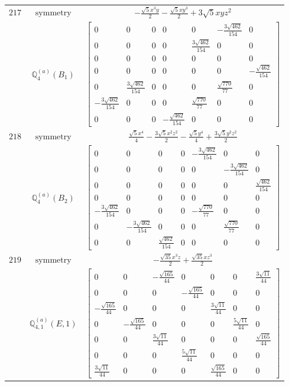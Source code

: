 \documentclass[fleqn,8pt,landscape]{jsarticle}
\begin{document}
\begin{longtable}{ccc}
$ 217 $ & $ \text{symmetry} $ & $ - \frac{\sqrt{5} x^{3} y}{2} - \frac{\sqrt{5} x y^{3}}{2} + 3 \sqrt{5} x y z^{2} $ \\
$  $ & $ \mathbb{Q}_{4}^{(a)}(B_{1}) $ & $ \begin{bmatrix} 0 & 0 & 0 & 0 & 0 & - \frac{3 \sqrt{462}}{154} & 0 \\ 0 & 0 & 0 & 0 & \frac{3 \sqrt{462}}{154} & 0 & 0 \\ 0 & 0 & 0 & 0 & 0 & 0 & 0 \\ 0 & 0 & 0 & 0 & 0 & 0 & - \frac{\sqrt{462}}{154} \\ 0 & \frac{3 \sqrt{462}}{154} & 0 & 0 & 0 & \frac{\sqrt{770}}{77} & 0 \\ - \frac{3 \sqrt{462}}{154} & 0 & 0 & 0 & \frac{\sqrt{770}}{77} & 0 & 0 \\ 0 & 0 & 0 & - \frac{\sqrt{462}}{154} & 0 & 0 & 0 \end{bmatrix} $ \\ \hline
$ 218 $ & $ \text{symmetry} $ & $ \frac{\sqrt{5} x^{4}}{4} - \frac{3 \sqrt{5} x^{2} z^{2}}{2} - \frac{\sqrt{5} y^{4}}{4} + \frac{3 \sqrt{5} y^{2} z^{2}}{2} $ \\
$  $ & $ \mathbb{Q}_{4}^{(a)}(B_{2}) $ & $ \begin{bmatrix} 0 & 0 & 0 & 0 & - \frac{3 \sqrt{462}}{154} & 0 & 0 \\ 0 & 0 & 0 & 0 & 0 & - \frac{3 \sqrt{462}}{154} & 0 \\ 0 & 0 & 0 & 0 & 0 & 0 & \frac{\sqrt{462}}{154} \\ 0 & 0 & 0 & 0 & 0 & 0 & 0 \\ - \frac{3 \sqrt{462}}{154} & 0 & 0 & 0 & - \frac{\sqrt{770}}{77} & 0 & 0 \\ 0 & - \frac{3 \sqrt{462}}{154} & 0 & 0 & 0 & \frac{\sqrt{770}}{77} & 0 \\ 0 & 0 & \frac{\sqrt{462}}{154} & 0 & 0 & 0 & 0 \end{bmatrix} $ \\ \hline
$ 219 $ & $ \text{symmetry} $ & $ - \frac{\sqrt{35} x^{3} z}{2} + \frac{\sqrt{35} x z^{3}}{2} $ \\
$  $ & $ \mathbb{Q}_{4,1}^{(a)}(E,1) $ & $ \begin{bmatrix} 0 & 0 & - \frac{\sqrt{165}}{44} & 0 & 0 & 0 & \frac{3 \sqrt{11}}{44} \\ 0 & 0 & 0 & - \frac{\sqrt{165}}{44} & 0 & 0 & 0 \\ - \frac{\sqrt{165}}{44} & 0 & 0 & 0 & \frac{3 \sqrt{11}}{44} & 0 & 0 \\ 0 & - \frac{\sqrt{165}}{44} & 0 & 0 & 0 & \frac{5 \sqrt{11}}{44} & 0 \\ 0 & 0 & \frac{3 \sqrt{11}}{44} & 0 & 0 & 0 & \frac{\sqrt{165}}{44} \\ 0 & 0 & 0 & \frac{5 \sqrt{11}}{44} & 0 & 0 & 0 \\ \frac{3 \sqrt{11}}{44} & 0 & 0 & 0 & \frac{\sqrt{165}}{44} & 0 & 0 \end{bmatrix} $ \\ \hline

\end{longtable}
\end{document}
